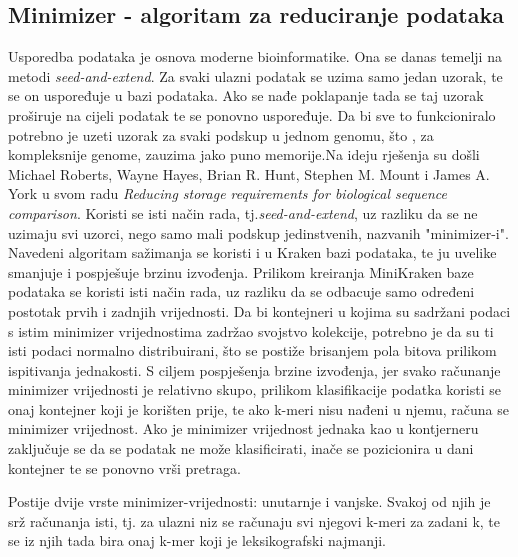 \documentclass[times, utf8, zavrsni]{fer}
\begin{document}
{\subsection{Minimizer - algoritam za reduciranje podataka}
Usporedba podataka je osnova moderne bioinformatike. Ona se danas temelji na metodi \textit{seed-and-extend}. Za svaki ulazni podatak se uzima samo jedan uzorak, te se on uspoređuje u bazi podataka. Ako se nađe poklapanje tada se taj uzorak proširuje na cijeli podatak te se ponovno uspoređuje. Da bi sve to funkcioniralo potrebno je uzeti uzorak za svaki podskup u jednom genomu, što , za kompleksnije genome, zauzima jako puno memorije.Na ideju rješenja su došli Michael Roberts, Wayne Hayes, Brian R. Hunt, Stephen M. Mount i James A. York u svom radu \textit{Reducing storage requirements for biological sequence comparison}. Koristi se isti način rada, tj.\textit{seed-and-extend}, uz razliku da se ne uzimaju svi uzorci, nego samo mali podskup jedinstvenih, nazvanih "minimizer-i".
\\ Navedeni algoritam sažimanja se koristi i u Kraken bazi podataka, te ju uvelike smanjuje i pospješuje brzinu izvođenja. Prilikom kreiranja MiniKraken baze podataka se koristi isti način rada, uz razliku da se odbacuje samo određeni postotak prvih i zadnjih vrijednosti. Da bi kontejneri u kojima su sadržani podaci s istim minimizer vrijednostima zadržao svojstvo kolekcije, potrebno je da su ti isti podaci normalno distribuirani, što se postiže brisanjem pola bitova prilikom ispitivanja jednakosti. S ciljem pospješenja brzine izvođenja, jer svako računanje minimizer vrijednosti je relativno skupo, prilikom klasifikacije podatka koristi se onaj kontejner koji je korišten prije, te ako k-meri nisu nađeni u njemu, računa se minimizer vrijednost. Ako je minimizer vrijednost jednaka kao u kontjerneru zaključuje se da se podatak ne može klasificirati, inače se pozicionira u dani kontejner te se ponovno vrši pretraga.

Postije dvije vrste minimizer-vrijednosti: unutarnje i vanjske. Svakoj od njih je srž računanja isti, tj. za ulazni niz se računaju svi njegovi k-meri za zadani k, te se iz njih tada bira onaj k-mer koji je leksikografski najmanji. 

\begin{figure}[htbp]
	\centering
	

\end{figure}}
\end{document}
